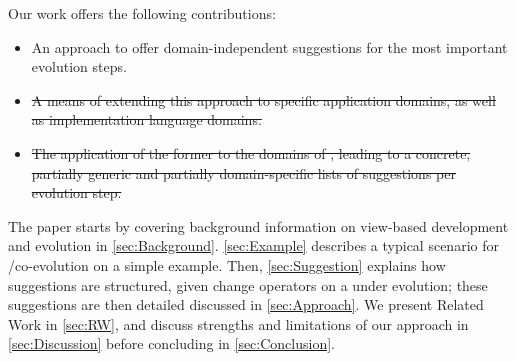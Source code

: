Our work offers the following contributions:
\begin{itemize}
    \item An approach to offer domain-independent suggestions for the most important \metamodel evolution steps.
    \item \sout{A means of extending this approach to specific application domains, 
		as well as implementation language domains.} 
    \item \sout{The application of the former to the domains of , leading to a concrete, partially generic and partially domain-specific lists of suggestions per \metamodel evolution step.}
\end{itemize}

The paper starts by covering background information on view-based development and
\metamodel evolution in \cref{sec:Background}. \cref{sec:Example} describes
a typical scenario for \metamodel/\viewtype co-evolution on a simple example. Then, \cref{sec:Suggestion} explains how \viewtype suggestions are structured, given
change operators on a \metamodel under evolution; these suggestions are then 
detailed discussed in \cref{sec:Approach}. We present Related Work in  \cref{sec:RW}, and discuss strengths and limitations of our approach in \cref{sec:Discussion} before concluding in \cref{sec:Conclusion}.